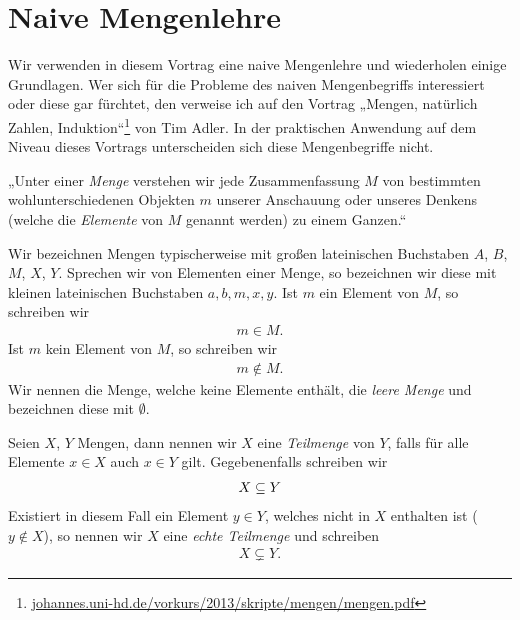 \section{Naive Mengenlehre}

Wir verwenden in diesem Vortrag eine naive Mengenlehre und wiederholen
einige Grundlagen. Wer sich für die Probleme des naiven Mengenbegriffs
interessiert oder diese gar fürchtet, den verweise ich auf den Vortrag
„Mengen, natürlich Zahlen,
Induktion“\footnote{\href{http://johannes.uni-hd.de/vorkurs/2013/skripte/mengen/mengen.pdf}{johannes.uni-hd.de/vorkurs/2013/skripte/mengen/mengen.pdf}}
von Tim Adler. In der praktischen Anwendung auf dem Niveau dieses Vortrags
unterscheiden sich diese Mengenbegriffe nicht.

\begin{definn}

  „Unter einer \emph{Menge} verstehen wir jede Zusammenfassung $M$ von
  bestimmten wohlunterschiedenen Objekten $m$ unserer Anschauung oder
  unseres Denkens (welche die \emph{Elemente} von $M$ genannt werden) zu
  einem Ganzen.“ 

\end{definn}


Wir bezeichnen Mengen typischerweise mit großen lateinischen Buchstaben
$A$, $B$, $M$, $X$, $Y$. Sprechen wir von Elementen einer Menge, so
bezeichnen wir diese mit kleinen lateinischen Buchstaben $a,b,m,x,y$. Ist
$m$ ein Element von $M$, so schreiben wir
\begin{align*}
  m \in M.
\end{align*}
Ist $m$ kein Element von $M$, so schreiben wir
\begin{align*}
  m \notin M.
\end{align*}
Wir nennen die Menge, welche keine Elemente enthält, die
\emph{leere Menge} und bezeichnen diese mit $\emptyset$.


\begin{definn}

  Seien $X$, $Y$ Mengen, dann nennen wir $X$ eine \emph{Teilmenge} von $Y$,
  falls für alle Elemente $x \in X$ auch $x \in Y$ gilt. Gegebenenfalls
  schreiben wir
  \begin{align*}
    X \sbeq Y %
  \end{align*}
  Existiert in diesem Fall ein Element $y\in Y$, welches nicht in $X$
  enthalten ist ($y\notin X$), so nennen wir $X$ eine \emph{echte
    Teilmenge} und schreiben
  \begin{align*}
    X \subsetneq Y.
  \end{align*}

\end{definn}

